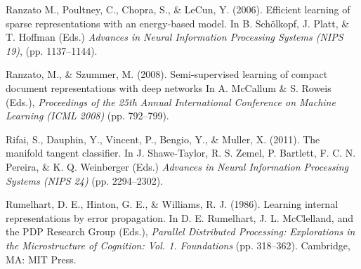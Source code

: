 \documentclass{article} %
\begin{document}
\begin{thebibliography}{100}
Ranzato M., Poultney, C., Chopra, S., \& LeCun, Y. (2006). 
\newblock Efficient learning of sparse representations with an energy-based model.
\newblock In B. Sch\"{o}lkopf, J. Platt, \& T. Hoffman (Eds.) \emph{Advances in Neural Information Processing Systems (NIPS 19)}, (pp. 1137--1144).

Ranzato, M., \& Szummer, M. (2008). 
\newblock Semi-supervised learning of compact document representations with deep networks
\newblock In A. McCallum \& S. Roweis (Eds.), \emph{Proceedings of the 25th Annual International Conference on Machine Learning (ICML 2008)} (pp. 792--799).



Rifai, S., Dauphin, Y., Vincent, P., Bengio, Y., \& Muller, X. (2011). 
\newblock The manifold tangent classifier. 
\newblock In J. Shawe-Taylor, R. S. Zemel, P. Bartlett, F. C. N. Pereira, \& K. Q. Weinberger (Eds.) \emph{Advances in Neural Information Processing Systems (NIPS 24)} (pp. 2294--2302). %


Rumelhart, D. E., Hinton, G. E., \& Williams, R. J. (1986).
\newblock Learning internal representations by error propagation.
\newblock In D. E. Rumelhart, J. L. McClelland, and the PDP Research Group (Eds.), \emph{Parallel Distributed Processing: Explorations in the Microstructure of Cognition: Vol. 1. Foundations} (pp. 318--362).  Cambridge, MA: MIT Press.  


\end{thebibliography}
\end{document}
